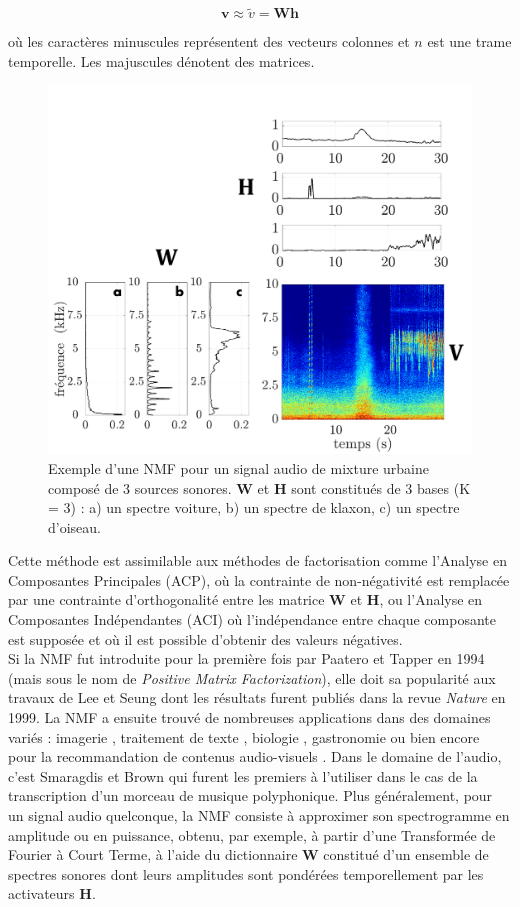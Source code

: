 \begin{equation}\label{eq:nmf_h}
\mathbf{v} \approx \tilde{v} =  \mathbf{Wh}
\end{equation}

où les caractères minuscules représentent des vecteurs colonnes et $n$ est une trame temporelle. Les majuscules dénotent des matrices.

\begin{figure}[t]
\centering
\includegraphics[width=.5\textwidth]{./figures/NMF/schema_introduction_nmf_fr.pdf}
\caption{Exemple d'une NMF pour un signal audio de mixture urbaine composé de 3 sources sonores. $\mathbf{W}$ et $\mathbf{H}$ sont constitués de 3 bases (K = 3) : a) un spectre voiture, b) un spectre de klaxon, c) un spectre d'oiseau.}
\label{fig:ex_NMF}
\end{figure}


Cette méthode est assimilable aux méthodes de factorisation comme l'Analyse en Composantes Principales (ACP), où la contrainte de non-négativité est remplacée par une contrainte d'orthogonalité entre les matrice $\mathbf{W}$ et $\mathbf{H}$, ou l'Analyse en Composantes Indépendantes (ACI) où l'indépendance entre chaque composante est supposée et où il est possible d'obtenir des valeurs négatives. \\

Si la NMF fut introduite pour la première fois par Paatero et Tapper \cite{paatero_positive_1994} en 1994 (mais sous le nom de \textit{Positive Matrix Factorization}), elle doit sa popularité aux travaux de Lee et Seung \cite{lee_learning_1999} dont les résultats furent publiés dans la revue \textit{Nature} en 1999. La NMF a ensuite trouvé de nombreuses applications dans des domaines variés : imagerie \cite{guillamet_introducing_2003, monga_robust_2007}, traitement de texte \cite{xu_document_2003, berry_email_2005}, biologie \cite{gao_improving_2005, chen_constrained_nodate}, gastronomie \cite{hawkins_clustering_2006} ou bien encore pour la recommandation de contenus audio-visuels \cite{luo2014efficient}. Dans le domaine de l'audio, c'est Smaragdis et Brown \cite{smaragdis_non-negative_2003} qui furent les premiers à l'utiliser dans le cas de la transcription d'un morceau de musique polyphonique. Plus généralement, pour un signal audio quelconque, la NMF consiste à approximer son spectrogramme en amplitude ou en puissance, obtenu, par exemple, à partir d'une Transformée de Fourier à Court Terme, à l'aide du dictionnaire $\textbf{W}$ constitué d'un ensemble de spectres sonores dont leurs amplitudes sont pondérées temporellement par les activateurs $\textbf{H}$.


